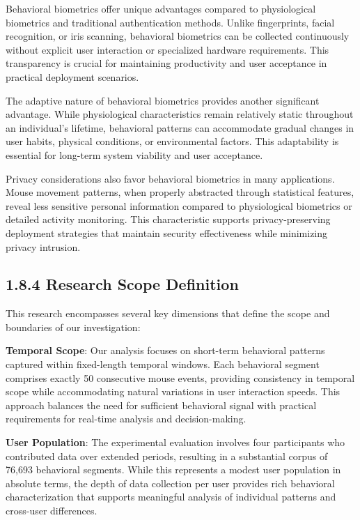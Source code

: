 \documentclass[
  12pt,
  a4paper,
]{report}
\begin{document}
Behavioral biometrics offer unique advantages compared to physiological
biometrics and traditional authentication methods. Unlike fingerprints,
facial recognition, or iris scanning, behavioral biometrics can be
collected continuously without explicit user interaction or specialized
hardware requirements. This transparency is crucial for maintaining
productivity and user acceptance in practical deployment scenarios.

The adaptive nature of behavioral biometrics provides another
significant advantage. While physiological characteristics remain
relatively static throughout an individual's lifetime, behavioral
patterns can accommodate gradual changes in user habits, physical
conditions, or environmental factors. This adaptability is essential for
long-term system viability and user acceptance.

Privacy considerations also favor behavioral biometrics in many
applications. Mouse movement patterns, when properly abstracted through
statistical features, reveal less sensitive personal information
compared to physiological biometrics or detailed activity monitoring.
This characteristic supports privacy-preserving deployment strategies
that maintain security effectiveness while minimizing privacy intrusion.

\subsection{1.8.4 Research Scope
Definition}\label{research-scope-definition}

This research encompasses several key dimensions that define the scope
and boundaries of our investigation:

\textbf{Temporal Scope}: Our analysis focuses on short-term behavioral
patterns captured within fixed-length temporal windows. Each behavioral
segment comprises exactly 50 consecutive mouse events, providing
consistency in temporal scope while accommodating natural variations in
user interaction speeds. This approach balances the need for sufficient
behavioral signal with practical requirements for real-time analysis and
decision-making.

\textbf{User Population}: The experimental evaluation involves four
participants who contributed data over extended periods, resulting in a
substantial corpus of 76,693 behavioral segments. While this represents
a modest user population in absolute terms, the depth of data collection
per user provides rich behavioral characterization that supports
meaningful analysis of individual patterns and cross-user differences.
\end{document}
